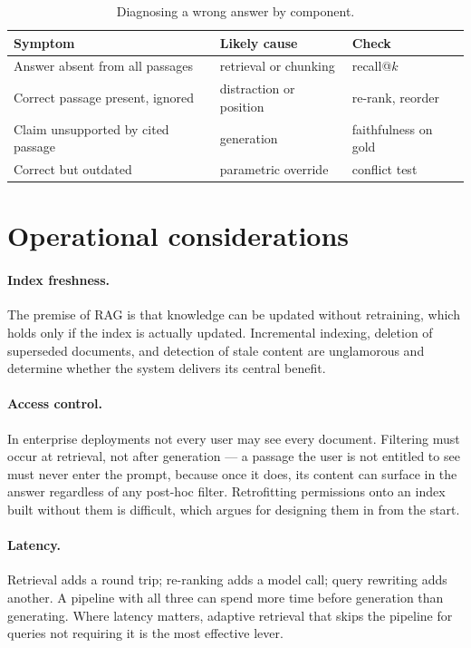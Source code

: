 \documentclass[11pt,a4paper]{article}
\begin{document}
\begin{table}[htbp]
  \centering
  \caption{Diagnosing a wrong answer by component.}
  \label{tab:diagnosis}
  \begin{tabular}{lll}
    \toprule
    \textbf{Symptom} & \textbf{Likely cause} & \textbf{Check} \\
    \midrule
    Answer absent from all passages & retrieval or chunking & recall@$k$ \\
    Correct passage present, ignored & distraction or position & re-rank, reorder \\
    Claim unsupported by cited passage & generation & faithfulness on gold \\
    Correct but outdated              & parametric override    & conflict test \\
    \bottomrule
  \end{tabular}
\end{table}

\section{Operational considerations}
\label{sec:operations}

\paragraph{Index freshness.}
The premise of RAG is that knowledge can be updated without retraining, which
holds only if the index is actually updated. Incremental indexing, deletion of
superseded documents, and detection of stale content are unglamorous and
determine whether the system delivers its central benefit.

\paragraph{Access control.}
In enterprise deployments not every user may see every document. Filtering
must occur at retrieval, not after generation --- a passage the user is not
entitled to see must never enter the prompt, because once it does, its content
can surface in the answer regardless of any post-hoc filter. Retrofitting
permissions onto an index built without them is difficult, which argues for
designing them in from the start.

\paragraph{Latency.}
Retrieval adds a round trip; re-ranking adds a model call; query rewriting adds
another. A pipeline with all three can spend more time before generation than
generating. Where latency matters, adaptive retrieval that skips the pipeline
for queries not requiring it is the most effective lever.
\end{document}
